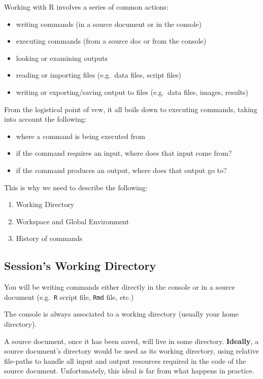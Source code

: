 \documentclass[
]{book}
\begin{document}
Working with R involves a series of common actions:

\begin{itemize}
\item
  writing commands (in a source document or in the console)
\item
  executing commands (from a source doc or from the console)
\item
  looking or examining outputs
\item
  reading or importing files (e.g.~data files, script files)
\item
  writing or exporting/saving output to files (e.g.~data files, images, results)
\end{itemize}

From the logistical point of vew, it all boils down to executing commands,
taking into account the following:

\begin{itemize}
\item
  where a command is being executed from
\item
  if the command requires an input, where does that input come from?
\item
  if the command produces an output, where does that output go to?
\end{itemize}

This is why we need to describe the following:

\begin{enumerate}
\def\labelenumi{\arabic{enumi}.}
\item
  Working Directory
\item
  Workspace and Global Environment
\item
  History of commands
\end{enumerate}

\hypertarget{sessions-working-directory}{%
\subsection{Session's Working Directory}\label{sessions-working-directory}}

You will be writing commands either directly in the console or in a source
document (e.g.~\texttt{R} script file, \texttt{Rmd} file, etc.)

The console is always associated to a working directory (usually your home
directory).

A source document, once it has been saved, will live in some directory.
\textbf{Ideally}, a source document's directory would be used as its working directory,
using relative file-paths to handle all input and output resources required in
the code of the source document. Unfortunately, this ideal is far from what
happens in practice.
\end{document}
